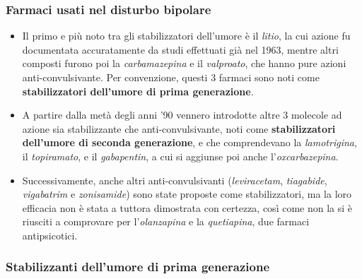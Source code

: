\subsubsection{Farmaci usati nel disturbo bipolare}

\begin{itemize}
\item
  Il primo e più noto tra gli stabilizzatori dell'umore è il
  \emph{litio}, la cui azione fu documentata accuratamente da studi
  effettuati già nel 1963, mentre altri composti furono poi la
  \emph{carbamazepina} e il \emph{valproato}, che hanno pure azioni
  anti-convulsivante. Per convenzione, questi 3 farmaci sono noti come
  \textbf{stabilizzatori dell'umore di prima generazione}.
\item
  A partire dalla metà degli anni '90 vennero introdotte altre 3
  molecole ad azione sia stabilizzante che anti-convulsivante, noti come
  \textbf{stabilizzatori dell'umore di seconda generazione}, e che
  comprendevano la \emph{lamotrigina}, il \emph{topiramato}, e il
  \emph{gabapentin}, a cui si aggiunse poi anche l'\emph{oxcarbazepina}.
\item
  Successivamente, anche altri anti-convulsivanti (\emph{leviracetam},
  \emph{tiagabide}, \emph{vigabatrim} e \emph{zonisamide}) sono state
  proposte come stabilizzatori, ma la loro efficacia non è stata a
  tuttora dimostrata con certezza, così come non la si è riusciti a
  comprovare per l'\emph{olanzapina} e la \emph{quetiapina}, due farmaci
  antipsicotici.
\end{itemize}

\subsubsection{Stabilizzanti dell'umore di prima generazione}

